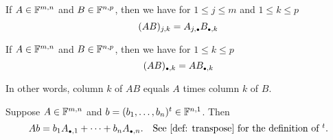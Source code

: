 \setcounter{thm}{45}
\begin{thm} 
  If $A \in \mathbb{F}^{m,n}$ and $B \in \mathbb{F}^{n,p}$, then we have for $1 \leq j \leq m$ and $1 \leq k \leq p$
  \begin{equation}
    (AB)_{j,k} = A_{j, \mathsmaller{\bullet}} B_{\mathsmaller{\bullet}, k}
  \end{equation}
\end{thm}

\setcounter{thm}{47}
\begin{thm}
  If $A \in \mathbb{F}^{m,n}$ and $B \in \mathbb{F}^{n,p}$, then we have for $1 \leq k \leq p$
  \begin{equation}
    (AB)_{\mathsmaller{\bullet}, k} = AB_{\mathsmaller{\bullet}, k}
  \end{equation}
  
  In other words, column $k$ of $AB$ equals $A$ times column $k$ of $B$.
\end{thm}

\setcounter{thm}{49}
\begin{thm}
  Suppose $A \in \mathbb{F}^{m,n}$ and  $b = (b_1, \ldots, b_n)^{t}\in \mathbb{F}^{n,1}$. Then 
  \begin{equation}
    Ab = b_1 A_{\mathsmaller{\bullet}, 1} + \dots + b_n A_{\mathsmaller{\bullet},n}. \quad $See \ref{def: transpose} for the definition of $^t.
  \end{equation}
\end{thm}

